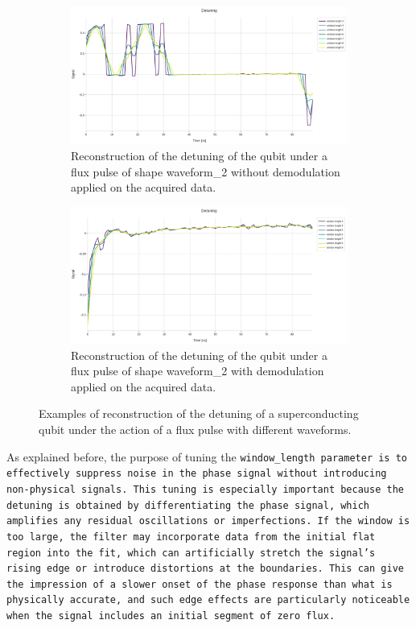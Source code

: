 \begin{figure}[h!]
    \begin{subfigure}[t]{0.495\textwidth}
        \includegraphics[width=\textwidth]{figures/png/Cryoscope/no_demod/long/detuning_windows.png}
        \caption{Reconstruction of the detuning of the qubit under a flux pulse of shape waveform\_2 without demodulation applied on the acquired data.}
        \label{fig:detuning:long_no_dem}
    \end{subfigure}
    \hfill
    \begin{subfigure}[t]{0.495\textwidth}
        \includegraphics[width=\textwidth]{figures/png/Cryoscope/demodulation/long/detuning_windows.png}
        \caption{Reconstruction of the detuning of the qubit under a flux pulse of shape waveform\_2 with demodulation applied on the acquired data.}
        \label{fig:detuning:long_dem}
    \end{subfigure}

    \caption{Examples of reconstruction of the detuning of a superconducting qubit under the action of a flux pulse with different waveforms.}
    \label{fig:detuning}
\end{figure}

As explained before, the purpose of tuning the \tt{window\_length} parameter is to effectively suppress noise in the phase signal without introducing non-physical signals. 
This tuning is especially important because the detuning is obtained by differentiating the phase signal, which amplifies any residual oscillations or imperfections. 
If the window is too large, the filter may incorporate data from the initial flat region into the fit, which can artificially stretch the signal's rising edge or introduce distortions at the boundaries. 
This can give the impression of a slower onset of the phase response than what is physically accurate, and such edge effects are particularly noticeable when the signal includes an initial segment of zero flux.

